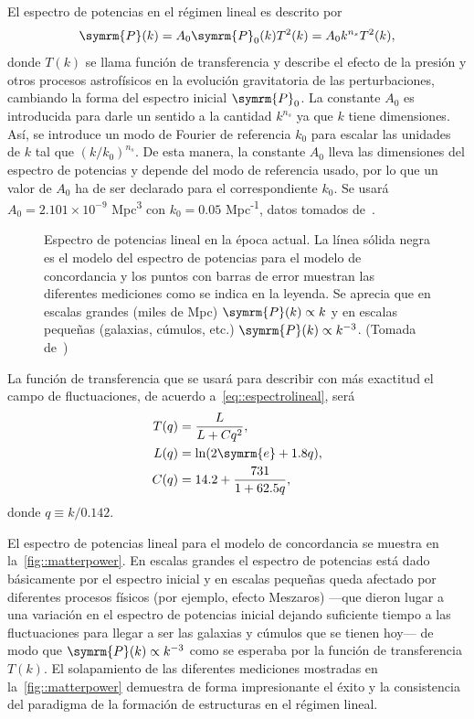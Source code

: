 El espectro de potencias en el régimen lineal es descrito por
\begin{equation}
    \symrm{P}(k)=A_0\symrm{P}_0(k)T^2(k)=A_0k^{n_s}T^2(k),\label{eq::espectrolineal}
\end{equation}
donde \(T(k)\) se llama función de transferencia y describe el efecto de la presión y otros procesos astrofísicos en la evolución gravitatoria de las perturbaciones, cambiando la forma del espectro inicial \(\symrm{P}_0\). La constante \(A_0\) es introducida para darle un sentido a la cantidad \(k^{n_s}\) ya que \(k\) tiene dimensiones. Así, se introduce un modo de Fourier de referencia \(k_0\) para escalar las unidades de \(k\) tal que \(\left(k/k_0\right)^{n_s}\). De esta manera, la constante \(A_0\) lleva las dimensiones del espectro de potencias y depende del modo de referencia usado, por lo que un valor de \(A_0\) ha de ser declarado para el correspondiente \(k_0\). Se usará \(A_0=2.101\times 10^{-9}\) Mpc\textsuperscript{3} con \(k_0=0.05\) Mpc\textsuperscript{-1}, datos tomados de~\cite{collaboration2020planck}.
\begin{figure}[t]
    \centering
    \def\svgwidth{0.95\textwidth}
    
    \caption[Espectro de potencias lineal en la época actual]{Espectro de potencias lineal en la época actual. La línea sólida negra es el modelo del espectro de potencias para el modelo de concordancia y los puntos con barras de error muestran las diferentes mediciones como se indica en la leyenda. Se aprecia que en escalas grandes (miles de Mpc) \(\symrm{P}(k)\propto k\) y en escalas pequeñas (galaxias, cúmulos, etc.) \(\symrm{P}(k)\propto k^{-3}\). (Tomada de~\cite{collaboration2020planck1})}
    \label{fig::matterpower}
\end{figure}

La función de transferencia que se usará para describir con más     exactitud el campo de fluctuaciones, de acuerdo a~\eqref{eq::espectrolineal}, será~\cite{eisenstein1998baryonic}
\begin{equation}
    \begin{aligned}
        T(q) & =\frac{L}{L+Cq^2},         \\
        L(q) & =\ln(2\symrm{e}+1.8q),     \\
        C(q) & =14.2+\frac{731}{1+62.5q},
    \end{aligned}\label{eq::transff}
\end{equation}
donde \(q\equiv k/0.142\).

El espectro de potencias lineal para el modelo de concordancia se muestra en la~\autoref{fig::matterpower}. En escalas grandes el espectro de potencias está dado básicamente por el espectro inicial y en escalas pequeñas queda afectado por diferentes procesos físicos (por ejemplo, efecto Meszaros) ---que dieron lugar a una variación en el espectro de potencias inicial dejando suficiente tiempo a las fluctuaciones para llegar a ser las galaxias y cúmulos que se tienen hoy--- de modo que \(\symrm{P}(k)\propto k^{-3}\) como se esperaba por la función de transferencia \(T(k)\). El solapamiento de las diferentes mediciones mostradas en la~\autoref{fig::matterpower} demuestra de forma impresionante el éxito y la consistencia del paradigma de la formación de estructuras en el régimen lineal.
